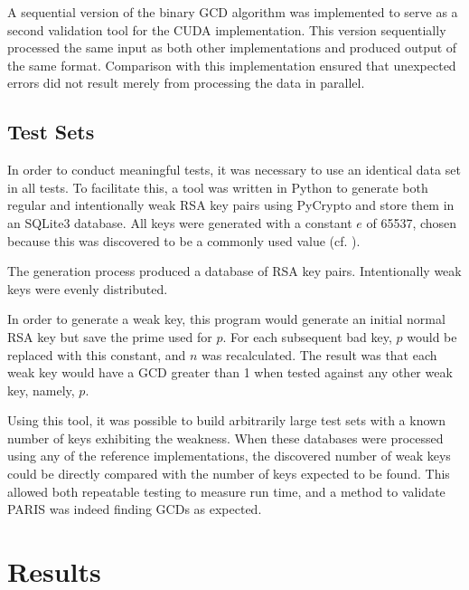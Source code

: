 \documentclass[smallextended]{svjour3}       %
\begin{document}
A sequential version of the binary GCD algorithm was implemented to serve as a 
second validation tool for the CUDA implementation. This version sequentially 
processed the same input as both other implementations and produced output of
the same format. Comparison with this implementation ensured that unexpected
errors did not result merely from processing the data in parallel.

\subsection{Test Sets}
\label{subsec:testsets}
In order to conduct meaningful tests, it was necessary to use an identical 
data set in all tests. To facilitate this, a tool was written in Python to 
generate both regular and intentionally weak RSA key pairs using PyCrypto and
store them in an SQLite3 database. All keys were generated with a 
constant $e$ of 65537, chosen because this was discovered to be a commonly used 
value (cf. \cite{lenstra2012ron}).

The generation process produced a database of RSA key pairs. 
Intentionally weak keys were evenly distributed. 

In order to generate a weak key, this program would generate an initial 
normal RSA key but save the prime used for $p$. For each subsequent bad key, 
$p$ would be replaced with this constant, and $n$ was recalculated. The 
result was that each weak key would have a GCD greater than 1 when 
tested against any other weak key, namely, $p$. 

Using this tool, it was possible to build arbitrarily large test sets with a 
known number of keys exhibiting the weakness. When these databases 
were processed using any of the reference implementations, the 
discovered number of weak keys could be directly compared with the 
number of keys expected to be found. This allowed both repeatable testing to 
measure run time, and a method to validate PARIS was indeed finding GCDs as
expected. 


\section{Results}
\label{sec:results}
\end{document}

